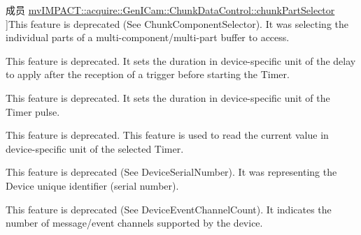\begin{DoxyRefList}
\hypertarget{deprecated__deprecated000056}{}%
成员 \hyperlink{classmv_i_m_p_a_c_t_1_1acquire_1_1_gen_i_cam_1_1_chunk_data_control_af192e7c6c38acc638f7bdfc18bb7f96e}{mv\+I\+M\+P\+A\+C\+T\+:\+:acquire\+:\+:Gen\+I\+Cam\+:\+:Chunk\+Data\+Control\+:\+:chunk\+Part\+Selector} ]This feature is deprecated (See Chunk\+Component\+Selector). It was selecting the individual parts of a multi-\/component/multi-\/part buffer to access.  
\item[\label{deprecated__deprecated000052}%
\hypertarget{deprecated__deprecated000052}{}%
成员 \hyperlink{classmv_i_m_p_a_c_t_1_1acquire_1_1_gen_i_cam_1_1_counter_and_timer_control_ae2a98a11b7a8ffd4379474d8d2118564}{mv\+I\+M\+P\+A\+C\+T\+:\+:acquire\+:\+:Gen\+I\+Cam\+:\+:Counter\+And\+Timer\+Control\+:\+:timer\+Delay\+Raw} ]This feature is deprecated. It sets the duration in device-\/specific unit of the delay to apply after the reception of a trigger before starting the Timer.  
\item[\label{deprecated__deprecated000051}%
\hypertarget{deprecated__deprecated000051}{}%
成员 \hyperlink{classmv_i_m_p_a_c_t_1_1acquire_1_1_gen_i_cam_1_1_counter_and_timer_control_ac8814d7bc9581dadc3411ceef2a4cb1e}{mv\+I\+M\+P\+A\+C\+T\+:\+:acquire\+:\+:Gen\+I\+Cam\+:\+:Counter\+And\+Timer\+Control\+:\+:timer\+Duration\+Raw} ]This feature is deprecated. It sets the duration in device-\/specific unit of the Timer pulse.  
\item[\label{deprecated__deprecated000053}%
\hypertarget{deprecated__deprecated000053}{}%
成员 \hyperlink{classmv_i_m_p_a_c_t_1_1acquire_1_1_gen_i_cam_1_1_counter_and_timer_control_a550a983e7334e89b755076bcee3cf80d}{mv\+I\+M\+P\+A\+C\+T\+:\+:acquire\+:\+:Gen\+I\+Cam\+:\+:Counter\+And\+Timer\+Control\+:\+:timer\+Value\+Raw} ]This feature is deprecated. This feature is used to read the current value in device-\/specific unit of the selected Timer.  
\item[\label{deprecated__deprecated000037}%
\hypertarget{deprecated__deprecated000037}{}%
成员 \hyperlink{classmv_i_m_p_a_c_t_1_1acquire_1_1_gen_i_cam_1_1_device_control_aadf1acdf754bef2f96225897e8982987}{mv\+I\+M\+P\+A\+C\+T\+:\+:acquire\+:\+:Gen\+I\+Cam\+:\+:Device\+Control\+:\+:device\+I\+D} ]This feature is deprecated (See Device\+Serial\+Number). It was representing the Device unique identifier (serial number).  
\item[\label{deprecated__deprecated000038}%
\hypertarget{deprecated__deprecated000038}{}%
成员 \hyperlink{classmv_i_m_p_a_c_t_1_1acquire_1_1_gen_i_cam_1_1_device_control_a5e73c3db7079302dfd97230cc3220bc7}{mv\+I\+M\+P\+A\+C\+T\+:\+:acquire\+:\+:Gen\+I\+Cam\+:\+:Device\+Control\+:\+:device\+Message\+Channel\+Count} ]This feature is deprecated (See Device\+Event\+Channel\+Count). It indicates the number of message/event channels supported by the device.  

\end{DoxyRefList}
